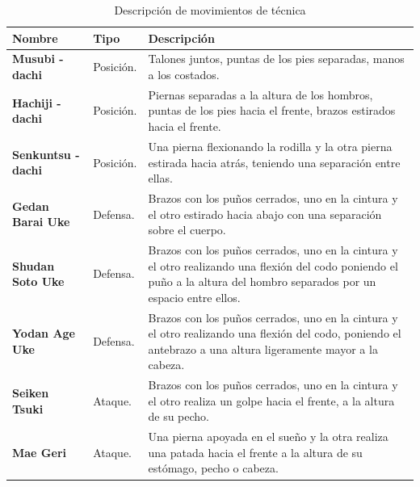 \begin{table}[H]
\centering
\begin{tabular}{| p{4 cm} | p{2 cm} | p{9 cm} |}
\hline
\rowcolor[rgb]{0.529412, 0.807843, 0.980392} {\textbf{Nombre}} & {\textbf{Tipo}} & {\textbf{Descripción}}\\
\hline
\textbf{Musubi - dachi} &  Posición. & Talones juntos, puntas de los pies separadas, manos a los costados.\\
\hline
\textbf{Hachiji - dachi} &  Posición. & Piernas separadas a la altura de los hombros, puntas de los pies hacia el frente, brazos estirados hacia el frente.\\
\hline
\textbf{Senkuntsu - dachi} &  Posición. & Una pierna flexionando la rodilla y la otra pierna estirada hacia atrás, teniendo una separación entre ellas.\\
\hline
\textbf{Gedan Barai Uke} &  Defensa. & Brazos con los puños cerrados, uno en la cintura y el otro estirado hacia abajo con una separación sobre el cuerpo.\\
\hline
\textbf{Shudan Soto Uke} &  Defensa. & Brazos con los puños cerrados, uno en la cintura y el otro realizando una flexión del codo poniendo el puño a la altura del hombro separados por un espacio entre ellos.\\
\hline
\textbf{Yodan Age Uke} &  Defensa. & Brazos con los puños cerrados, uno en la cintura y el otro realizando una flexión del codo, poniendo el antebrazo a una altura ligeramente mayor a la cabeza.\\
\hline
\textbf{Seiken Tsuki} &  Ataque. & Brazos con los puños cerrados, uno en la cintura y el otro realiza un golpe hacia el frente, a la altura de su pecho.\\
\hline
\textbf{Mae Geri} &  Ataque. & Una pierna apoyada en el sueño y la otra realiza una patada hacia el frente a la altura de su estómago, pecho o cabeza.\\
\hline
\end{tabular}
\caption{Descripción de movimientos de técnica}
\label{tab:DMT}
\end{table} 